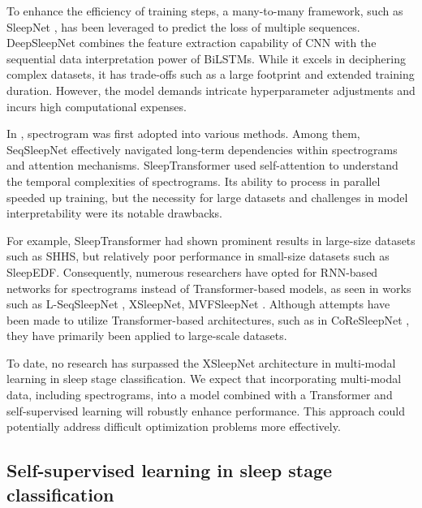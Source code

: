 To enhance the efficiency of training steps, a many-to-many framework, such as SleepNet \cite{biswal2017sleepnet}, has been leveraged to predict the loss of multiple sequences.
%
DeepSleepNet \cite{supratak2017deepsleepnet} combines the feature extraction capability of CNN with the sequential data interpretation power of BiLSTMs. While it excels in deciphering complex datasets, it has trade-offs such as a large footprint and extended training duration.
%
However, the model demands intricate hyperparameter adjustments and incurs high computational expenses.

In \cite{oropesa1999sleep}, spectrogram was first adopted into various methods. Among them, SeqSleepNet \cite{phan2019seqsleepnet} effectively navigated long-term dependencies within spectrograms and attention mechanisms.
%
SleepTransformer \cite{phan2022sleeptransformer} used self-attention to understand the temporal complexities of spectrograms. Its ability to process in parallel speeded up training, but the necessity for large datasets and challenges in model interpretability were its notable drawbacks. 

For example, SleepTransformer had shown prominent results in large-size datasets such as SHHS, but relatively poor performance in small-size datasets such as SleepEDF. 
%
Consequently, numerous researchers have opted for RNN-based networks for spectrograms instead of Transformer-based models, as seen in works such as L-SeqSleepNet \cite{phan2023seqsleepnet}, XSleepNet, MVFSleepNet \cite{li2022mvf}. Although attempts have been made to utilize Transformer-based architectures, such as in CoReSleepNet \cite{kontras2023coresleep}, they have primarily been applied to large-scale datasets.

To date, no research has surpassed the XSleepNet architecture in multi-modal learning in sleep stage classification.
%
We expect that incorporating multi-modal data, including spectrograms, into a model combined with a Transformer and self-supervised learning will robustly enhance performance. This approach could potentially address difficult optimization problems more effectively.


\subsection{Self-supervised learning in sleep stage classification} %

